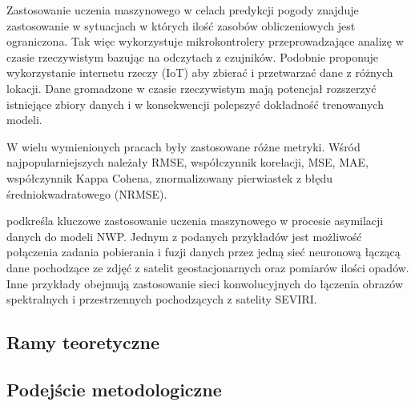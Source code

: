 Zastosowanie uczenia maszynowego w celach predykcji pogody znajduje zastosowanie
w sytuacjach w których ilość zasobów obliczeniowych jest ograniczona. Tak więc
\cite{weather-forecasting-using-ml} wykorzystuje
mikrokontrolery przeprowadzające analizę w czasie rzeczywistym bazując na odczytach z 
czujników. Podobnie \cite{smart-weather-forecasting}
proponuje wykorzystanie internetu rzeczy (IoT) aby zbierać i przetwarzać dane z różnych lokacji.
Dane gromadzone w czasie rzeczywistym mają potencjał rozszerzyć istniejące zbiory danych
i w konsekwencji polepszyć dokładność trenowanych modeli.

W wielu wymienionych pracach \cite{development-and-application-of-ml-in}
były zastosowane różne metryki. Wśród najpopularniejszych
należały RMSE, współczynnik korelacji, MSE, MAE, współczynnik Kappa Cohena,
znormalizowany pierwiastek z błędu średniokwadratowego (NRMSE).

\cite{ai-revolutionises-weather-prediction}
podkreśla kluczowe zastosowanie uczenia maszynowego w procesie asymilacji danych do modeli NWP.
Jednym z podanych przykładów jest możliwość połączenia zadania pobierania i fuzji danych 
przez jedną sieć neuronową łączącą dane pochodzące ze zdjęć z satelit geostacjonarnych oraz 
pomiarów ilości opadów. Inne przykłady obejmują zastosowanie sieci konwolucyjnych do łączenia
obrazów spektralnych i przestrzennych pochodzących z satelity SEVIRI. 

\subsection{Ramy teoretyczne}

\subsection{Podejście metodologiczne}

